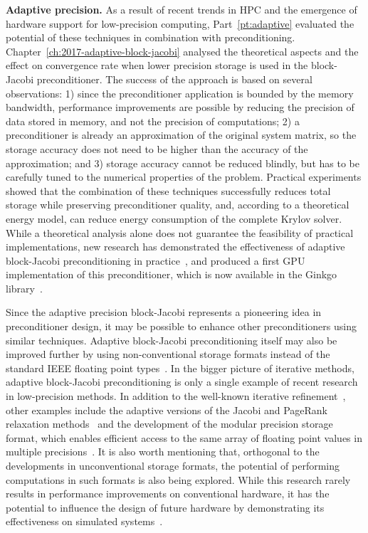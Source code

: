 \noindent\textbf{Adaptive precision.}
As a result of recent trends in HPC and the emergence of hardware support for
low-precision computing, Part~\ref{pt:adaptive} evaluated the potential of these
techniques in combination with preconditioning.
Chapter~\ref{ch:2017-adaptive-block-jacobi} analysed the theoretical aspects and
the effect on convergence rate when lower precision storage is used in the
block-Jacobi preconditioner. The success of the approach is based on
several observations: 1) since the preconditioner application is bounded by the
memory bandwidth, performance improvements are possible by reducing the
precision of data stored in memory, and not the precision of computations; 2) a
preconditioner is already an approximation of the original system matrix, so the
storage accuracy does not need to be higher than the accuracy of the
approximation; and 3) storage accuracy cannot be reduced blindly, but has to be
carefully tuned to the numerical properties of the problem. Practical
experiments showed that the combination of these techniques successfully reduces
total storage while preserving preconditioner quality, and, according to a
theoretical energy model, can reduce energy consumption of the complete Krylov
solver. While a theoretical analysis alone does not guarantee the feasibility of
practical implementations, new research has demonstrated the effectiveness of
adaptive block-Jacobi preconditioning in practice~\cite{adaptive-jacobi-gpu},
and produced a first GPU implementation of this preconditioner, which is now
available in the Ginkgo library~\cite{ginkgo}.

Since the adaptive precision block-Jacobi represents a pioneering idea in
preconditioner design, it may be possible to enhance other preconditioners using
similar techniques. Adaptive block-Jacobi preconditioning itself may also be
improved further by using non-conventional storage formats instead of the
standard IEEE floating point types~\cite{adaptive-jacobi-gpu}. In the bigger
picture of iterative methods, adaptive block-Jacobi preconditioning is only a
single example of recent research in low-precision methods. In addition to the
well-known iterative refinement~\cite{higham-ir}, other examples include the
adaptive versions of the Jacobi and PageRank relaxation
methods~\cite{jacobi,jacobi-modular,pagerank} and the development of the modular
precision storage format, which enables efficient access to the same array of
floating point values in multiple
precisions~\cite{jacobi-modular,pagerank,anzt-ir}. It is also worth mentioning
that, orthogonal to the developments in unconventional storage formats, the
potential of performing computations in such formats is also being explored.
While this research rarely results in performance improvements on conventional
hardware, it has the potential to influence the design of future hardware by
demonstrating its effectiveness on simulated systems~\cite{floatx, flexfloat}.

